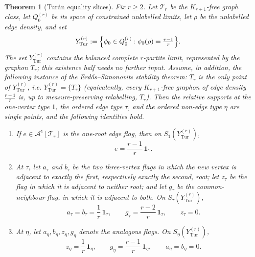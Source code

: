 \documentclass[11pt]{article}
\newtheorem{theorem}{Theorem}
\theoremstyle{definition}
\newcommand{\A}{\mathcal{A}}
\newcommand{\T}{\mathcal{T}}
\newcommand{\one}{\mathbf 1}
\newcommand{\vtype}{\mathsf{1}}
\begin{document}
\begin{theorem}[Tur\'an equality slices]\label{thm:turan-slice}
Fix $r\ge2$.  Let $\T_r$ be the $K_{r+1}$-free graph class, let $Q_0^{(r)}$ be its space
of constrained unlabelled limits, let $\rho$ be the unlabelled edge density, and set
\[
  Y_{\mathrm{Tur}}^{(r)}
  :=
  \Bigl\{\phi_0\in Q_0^{(r)}:\phi_0(\rho)=\tfrac{r-1}{r}\Bigr\}.
\]
The set $Y_{\mathrm{Tur}}^{(r)}$ contains the balanced complete $r$-partite limit,
represented by the graphon $T_r$; this existence half needs no further input.  Assume, in
addition, the following instance of the Erd\H{o}s--Simonovits stability theorem: $T_r$ is
the \emph{only} point of $Y_{\mathrm{Tur}}^{(r)}$, i.e. $Y_{\mathrm{Tur}}^{(r)}=\{T_r\}$
(equivalently, every $K_{r+1}$-free graphon of edge density $\frac{r-1}r$ is, up to
measure-preserving relabelling, $T_r$).  Then the relative supports at the one-vertex type
$\vtype$, the ordered edge type $\tau$, and the ordered non-edge type $\eta$ are single
points, and the following identities hold.
\begin{enumerate}[label=\textup{(\roman*)}, leftmargin=2.5em]
  \item If $e\in\A^{\vtype}[\T_r]$ is the one-root edge flag, then on
        $S_{\vtype}(Y_{\mathrm{Tur}}^{(r)})$,
        \[
          e=\frac{r-1}{r}\,\one_{\vtype} .
        \]
  \item At $\tau$, let $a_\tau$ and $b_\tau$ be the two three-vertex flags in which the
        new vertex is adjacent to exactly the first, respectively exactly the second,
        root; let $z_\tau$ be the flag in which it is adjacent to neither root; and let
        $g_\tau$ be the common-neighbour flag, in which it is adjacent to both.  On
        $S_\tau(Y_{\mathrm{Tur}}^{(r)})$,
        \[
          a_\tau=b_\tau=\frac1r\,\one_\tau,
          \qquad
          g_\tau=\frac{r-2}{r}\,\one_\tau,
          \qquad
          z_\tau=0 .
        \]
  \item At $\eta$, let $a_\eta,b_\eta,z_\eta,g_\eta$ denote the analogous flags.  On
        $S_\eta(Y_{\mathrm{Tur}}^{(r)})$,
        \[
          z_\eta=\frac1r\,\one_\eta,
          \qquad
          g_\eta=\frac{r-1}{r}\,\one_\eta,
          \qquad
          a_\eta=b_\eta=0 .
        \]
\end{enumerate}
\end{theorem}
\end{document}
